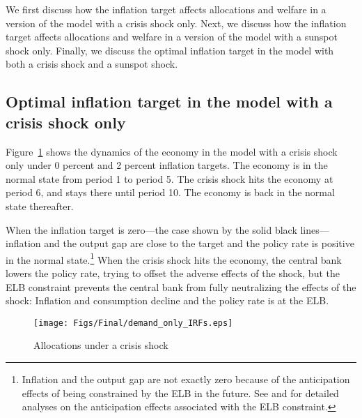\documentclass[11pt]{article}
\begin{document}
	We first discuss how the inflation target affects allocations and welfare in a version of the model with a crisis shock only. Next, we discuss how the inflation target affects allocations and welfare in a version of the model with a sunspot shock only. Finally, we discuss the optimal inflation target in the model with both a crisis shock and a sunspot shock.
	
	\subsection{Optimal inflation target in the model with a crisis shock only}
	
	Figure~\ref{fig:IRFs_Target} shows the dynamics of the economy in the model with a crisis shock only under 0 percent and 2 percent inflation targets. The economy is in the normal state from period 1 to period 5. The crisis shock hits the economy at period 6, and stays there until period 10. The economy is back in the normal state thereafter. 
	
	When the inflation target is zero---the case shown by the solid black lines---inflation and the output gap are close to the target and the policy rate is positive in the normal state.\footnote{Inflation and the output gap are not exactly zero because of the anticipation effects of being constrained by the ELB in the future. See \citet{HillsNakataSchmidt2016} and \citet{NakataSchmidtForthcomingJME} for detailed analyses on the anticipation effects associated with the ELB constraint.} When the crisis shock hits the economy, the central bank lowers the policy rate, trying to offset the adverse effects of the shock, but the ELB constraint prevents the central bank from fully neutralizing the effects of the shock: Inflation and consumption decline and the policy rate is at the ELB. 
	
	
	\begin{figure}[!h]
		\begin{center}
			\caption{Allocations under a crisis shock\label{fig:IRFs_Target}}
			\texttt{[image: Figs/Final/demand\_only\_IRFs.eps]}\\
		\end{center}
	\end{figure}
	
\end{document}

